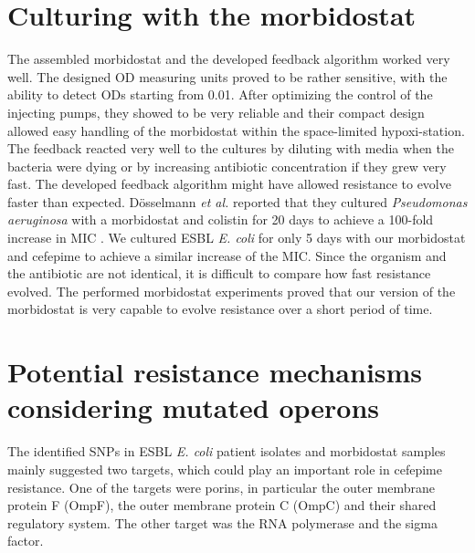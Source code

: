 \section{Culturing with the morbidostat}
The assembled morbidostat and the developed feedback algorithm worked very well. The designed OD measuring units proved to be rather sensitive, with the ability to detect ODs starting from 0.01. After optimizing the control of the injecting pumps, they showed to be very reliable and their compact design allowed easy handling of the morbidostat within the space-limited hypoxi-station.
The feedback reacted very well to the cultures by diluting with media when the bacteria were dying or by increasing antibiotic concentration if they grew very fast. The developed feedback algorithm might have allowed resistance to evolve faster than expected. Dösselmann \textit{et al.} reported that they cultured \textit{Pseudomonas aeruginosa} with a morbidostat and colistin for 20 days to achieve a 100-fold increase in MIC \cite{doselmann_rapid_2017}. We cultured ESBL \textit{E. coli} for only 5 days with our morbidostat and cefepime to achieve a similar increase of the MIC. Since the organism and the antibiotic are not identical, it is difficult to compare how fast resistance evolved. The performed morbidostat experiments proved that our version of the morbidostat is very capable to evolve resistance over a short period of time. 

\section{Potential resistance mechanisms considering mutated operons}
The identified SNPs in ESBL \textit{E. coli} patient isolates and morbidostat samples mainly suggested two targets, which could play an important role in cefepime resistance. One of the targets were porins, in particular the outer membrane protein F (OmpF), the outer membrane protein C (OmpC)  and their shared regulatory system. The other target was the RNA polymerase and the sigma factor. 
